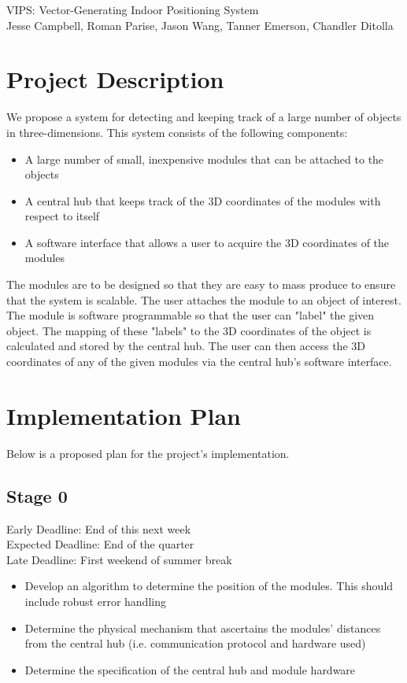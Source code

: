 \documentclass{article}
\begin{document}
\begin{center}
{\Large VIPS: Vector-Generating Indoor Positioning System} \\
{\small Jesse Campbell, Roman Parise, Jason Wang, Tanner Emerson, Chandler Ditolla}
\end{center}
\section{Project Description}
We propose a system for detecting and keeping track of a large number of objects in three-dimensions.
This system consists of the following components:
\begin{itemize}
\item A large number of small, inexpensive modules that can be attached to the objects
\item A central hub that keeps track of the 3D coordinates of the modules with respect to itself
\item A software interface that allows a user to acquire the 3D coordinates of the modules
\end{itemize}
The modules are to be designed so that they are easy to mass produce to ensure that the system is scalable.
The user attaches the module to an object of interest.
The module is software programmable so that the user can "label" the given object.
The mapping of these "labels" to the 3D coordinates of the object is calculated and stored by the central hub.
The user can then access the 3D coordinates of any of the given modules via the central hub's software interface.

\section{Implementation Plan}
Below is a proposed plan for the project's implementation.
\subsection{Stage 0}
Early Deadline: End of this next week \\
Expected Deadline: End of the quarter \\
Late Deadline: First weekend of summer break \\
\begin{itemize}
\item Develop an algorithm to determine the position of the modules. This should include robust error handling
\item Determine the physical mechanism that ascertains the modules' distances from the central hub (i.e. communication protocol and hardware used)
\item Determine the specification of the central hub and module hardware
\end{itemize}
\end{document}
